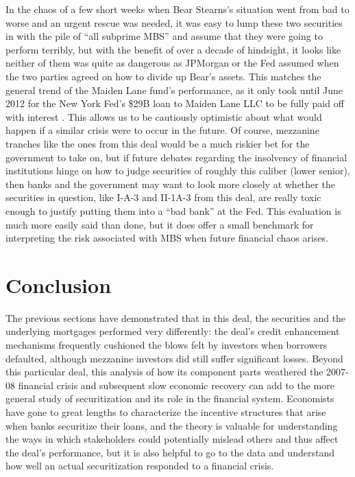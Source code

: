 \documentclass[12pt]{article}
\begin{document}
In the chaos of a few short weeks when Bear Stearns’s situation went from bad to worse and an urgent rescue was needed, it was easy to lump these two securities in with the pile of “all subprime MBS” and assume that they were going to perform terribly, but with the benefit of over a decade of hindsight, it looks like neither of them was quite as dangerous as JPMorgan or the Fed assumed when the two parties agreed on how to divide up Bear’s assets. This matches the general trend of the Maiden Lane fund’s performance, as it only took until June 2012 for the New York Fed’s \$29B loan to Maiden Lane LLC to be fully paid off with interest \parencite{schaefer12}. This allows us to be cautiously optimistic about what would happen if a similar crisis were to occur in the future. Of course, mezzanine tranches like the ones from this deal would be a much riskier bet for the government to take on, but if future debates regarding the insolvency of financial institutions hinge on how to judge securities of roughly this caliber (lower senior), then banks and the government may want to look more closely at whether the securities in question, like I-A-3 and II-1A-3 from this deal, are really toxic enough to justify putting them into a “bad bank” at the Fed. This evaluation is much more easily said than done, but it does offer a small benchmark for interpreting the risk associated with MBS when future financial chaos arises.

\section*{Conclusion}
The previous sections have demonstrated that in this deal, the securities and the underlying mortgages performed very differently: the deal's credit enhancement mechanisms frequently cushioned the blows felt by investors when borrowers defaulted, although mezzanine investors did still suffer significant losses. Beyond this particular deal, this analysis of how its component parts weathered the 2007-08 financial crisis and subsequent slow economic recovery can add to the more general study of securitization and its role in the financial system. Economists have gone to great lengths to characterize the incentive structures that arise when banks securitize their loans, and the theory is valuable for understanding the ways in which stakeholders could potentially mislead others and thus affect the deal’s performance, but it is also helpful to go to the data and understand how well an actual securitization responded to a financial crisis.
\end{document}
